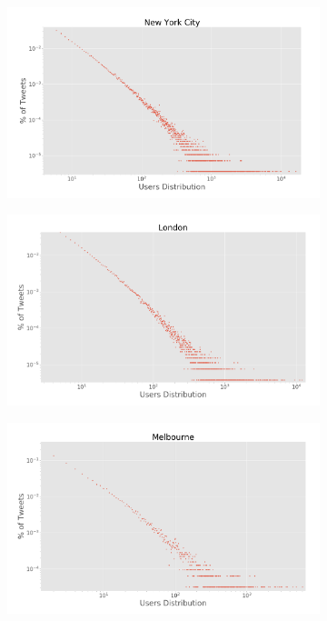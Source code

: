 \begin{figure}[h]
	\medskip
	
	\begin{subfigure}[t]{0.45\textwidth}
		\centering
		\includegraphics[width=1\linewidth]{figures/nyc_loglog_users.png}
		\caption{}
		\label{subfig:newyork_loglog_users}
	\end{subfigure}
	\quad
	\begin{subfigure}[t]{0.45\textwidth}
		\centering
		\includegraphics[width=1\linewidth]{figures/london_loglog_users.png}
		\caption{}
		\label{subfig:london_loglog_users}
	\end{subfigure}
	
	\medskip
	
	\begin{subfigure}[t]{0.45\textwidth}
		\centering
		\includegraphics[width=1\linewidth]{figures/melbourne_loglog_users.png}
		\caption{}
		\label{subfig:melbourne_loglog_users}
	\end{subfigure}
	

\end{figure}

